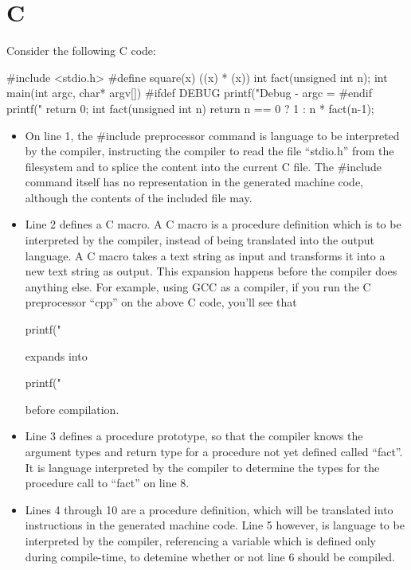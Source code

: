  \section{C}
Consider the following C code:

 \begin{code}
#include <stdio.h>
#define square(x) ((x) * (x))
int fact(unsigned int n);
int main(int argc, char* argv[]){
#ifdef DEBUG
  printf("Debug - argc = %
#endif
 printf("%
  return 0;
}
int fact(unsigned int n){
  return n == 0
    ? 1
    : n * fact(n-1);
}
 \end{code}

 \begin{itemize}
  \item
     On line 1, the \#include preprocessor command
     is language to be interpreted by the compiler,
     instructing the compiler to
     read the file ``stdio.h''
     from the filesystem and to splice the content
     into the current C file.  The \#include command
     itself has no representation in the generated machine code, although the contents
     of the included file may.

  \item
     Line 2 defines a C macro. A C macro is a procedure definition which
     is to be interpreted by the compiler, instead of being translated
     into the output language.
     A C macro takes a text
     string as input and transforms it into a new text string as output.
     This expansion happens before the compiler does anything
     else.  For example, using GCC as a compiler, if you run the C preprocessor
     ``cpp'' on the above C code, you'll see that

     \begin{code}
  printf("%
     \end{code}

     \noindent expands into

     \begin{code}
  printf("%
     \end{code}

     \noindent before compilation.

  \item
     Line 3 defines a procedure prototype, so that
     the compiler knows the argument types and return type for a procedure not
     yet defined called ``fact''.
     It is language interpreted by the compiler to determine the types for the procedure
     call to ``fact'' on line 8.
  \item
     Lines 4 through 10 are a procedure definition, which will be
     translated into instructions in the generated machine code.  Line 5 however, is language
     to be interpreted by the compiler, referencing a variable which is defined
     only during compile-time, to detemine whether or not line 6 should be
     compiled.
 \end{itemize}

